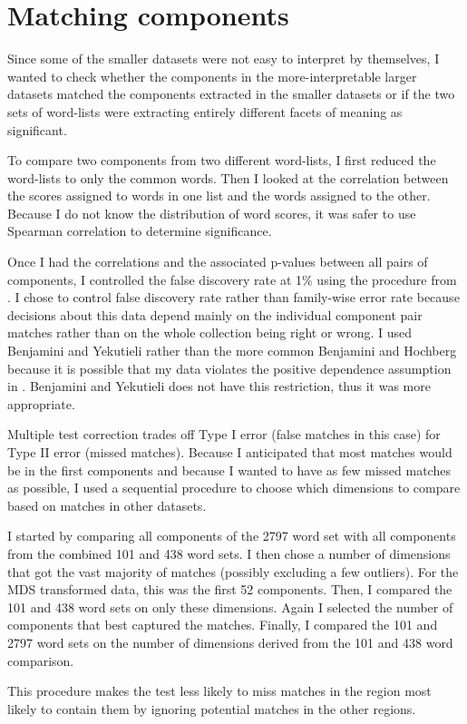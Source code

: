 \section{Matching components}
\label{sec:matchingcomponents}
Since some of the smaller datasets were not easy to interpret by themselves, I
wanted to check whether the components in the more-interpretable larger datasets
matched the components extracted in the smaller datasets or if the two sets
of word-lists were extracting entirely different facets of meaning as
significant.

To compare two components from two different word-lists, I first reduced the
word-lists to only the common words. Then I looked at the correlation between
the scores assigned to words in one list and the words assigned to the other.
Because I do not know the distribution of word scores, it was safer to use
Spearman correlation to determine significance.

Once I had the correlations and the associated p-values between all pairs of
components, I controlled the false discovery rate at 1\% using the procedure
from . I chose to control false discovery 
rate rather than
family-wise error rate because decisions about this data depend mainly on the
individual component pair matches rather than on the whole collection being 
right or wrong. I used Benjamini and Yekutieli rather than the more common
Benjamini and Hochberg because it is possible that my data violates the 
positive dependence assumption in 
. Benjamini and Yekutieli does not have this restriction, thus it was
more appropriate.

Multiple test correction trades off Type I error (false matches in this case) 
for Type II error (missed matches). Because I anticipated that most matches
would be in the first components and because I wanted to have as few missed
matches as possible, I used a sequential procedure to choose which dimensions
to compare based on matches in other datasets.

I started by comparing all components of the 2797 word set with all 
components from the combined 101 and 438 word sets. I then chose a number of
dimensions that got the vast majority of matches (possibly excluding a few
outliers). For the MDS transformed data, this was the first 52 components. 
Then, I compared the 101 and 438 word sets on only these dimensions. Again I
selected the number of components that best captured the matches. Finally,
I compared the 101 and 2797 word sets on the number of dimensions derived from
the 101 and 438 word comparison. 

This procedure makes the test less likely to miss matches in the region most
likely to contain them by ignoring potential matches in the other regions.
